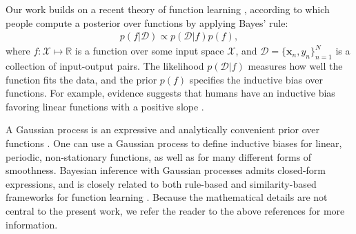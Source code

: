 \documentclass[10pt,letterpaper]{article}
\begin{document}


Our work builds on a recent theory of function learning \cite{lucas2015rational}, according to which people compute a posterior over functions by applying Bayes' rule:
\begin{align}
p(f|\mathcal{D}) \propto p(\mathcal{D}|f) p(f),
\end{align}
where $f: \mathcal{X} \mapsto \mathbb{R}$ is a function over some input space $\mathcal{X}$, and $\mathcal{D} = \{\mathbf{x}_n,y_n\}_{n=1}^N$ is a collection of input-output pairs. The likelihood $p(\mathcal{D}|f)$ measures how well the function fits the data, and the prior $p(f)$ specifies the inductive bias over functions. For example, evidence suggests that humans have an inductive bias favoring linear functions with a positive slope \cite{brehmer1974hypotheses,kalish2007iterated}.

A Gaussian process is an expressive and analytically convenient prior over functions \cite{rasmussen2006gaussian}. One can use a Gaussian process to define inductive biases for linear, periodic, non-stationary functions, as well as for many different forms of smoothness. Bayesian inference with Gaussian processes admits closed-form expressions, and is closely related to both rule-based and similarity-based frameworks for function learning \cite{lucas2015rational}. Because the mathematical details are not central to the present work, we refer the reader to the above references for more information.
\end{document}
